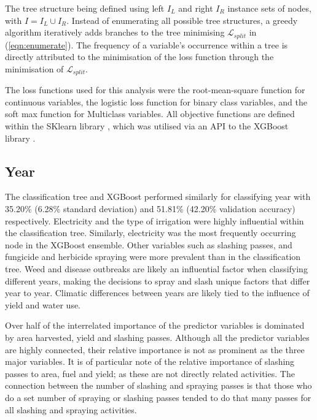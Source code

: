 \documentclass[review,12pt,authoryear]{elsarticle}
\begin{document}
\begin{linenumbers}
The tree structure being defined using left $I_L$ and right $I_R$ instance sets of nodes, with $I = I_L \cup I_R$. Instead of enumerating all possible tree structures, a greedy algorithm iteratively adds branches to the tree minimising $ \mathcal{L}_{split} $ in (\ref{eqn:enumerate}). The frequency of a variable's occurrence within a tree is directly attributed to the minimisation of the loss function through the minimisation of $ \mathcal{L}_{split} $.
\par
The loss functions used for this analysis were the root-mean-square function for continuous variables, the logistic loss function for binary class variables, and the soft max function for Multiclass variables. All objective functions are defined within the SKlearn library \citep{sklearn_api}, which was utilised via an API to the XGBoost library \citep{chenXGBoostScalableTree2016}.
\par
 \subsection{Year}

 The classification tree and XGBoost performed similarly for classifying year with 35.20\% (6.28\% standard deviation) and 51.81\% (42.20\% validation accuracy) respectively. Electricity and the type of irrigation were highly influential within the classification tree. Similarly, electricity was the most frequently occurring node in the XGBoost ensemble. Other variables such as slashing passes, and fungicide and herbicide spraying were more prevalent than in the classification tree. Weed and disease outbreaks are likely an influential factor when classifying different years, making the decisions to spray and slash unique factors that differ year to year. Climatic differences between years are likely tied to the influence of yield and water use.
 \par
 Over half of the interrelated importance of the predictor variables is dominated by area harvested, yield and slashing passes. Although all the predictor variables are highly connected, their relative importance is not as prominent as the three major variables. It is of particular note of the relative importance of slashing passes to area, fuel and yield; as these are not directly related activities. The connection between the number of slashing and spraying passes is that those who do a set number of spraying or slashing passes tended to do that many passes for all slashing and spraying activities.
 

\end{linenumbers}
\end{document}
